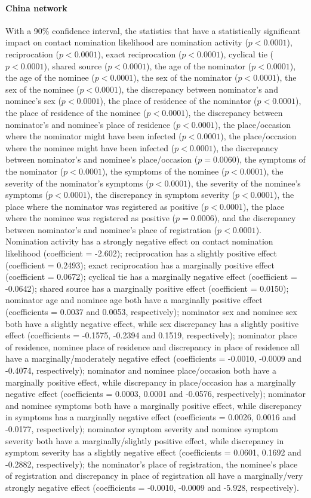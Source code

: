 \paragraph{China network} With a 90\% confidence interval, the statistics that have a statistically significant impact on contact nomination likelihood are nomination activity ($p<0.0001$), reciprocation ($p<0.0001$), exact reciprocation ($p<0.0001$), cyclical tie ($p<0.0001$), shared source ($p<0.0001$), the age of the nominator ($p<0.0001$), the age of the nominee ($p<0.0001$), the sex of the nominator ($p<0.0001$), the sex of the nominee ($p<0.0001$), the discrepancy between nominator's and nominee's sex ($p<0.0001$), the place of residence of the nominator ($p<0.0001$), the place of residence of the nominee ($p<0.0001$), the discrepancy between nominator's and nominee's place of residence ($p<0.0001$), the place/occasion where the nominator might have been infected ($p<0.0001$), the place/occasion where the nominee might have been infected ($p<0.0001$), the discrepancy between nominator's and nominee's place/occasion ($p=0.0060$), the symptoms of the nominator ($p<0.0001$), the symptoms of the nominee ($p<0.0001$), the severity of the nominator's symptoms ($p<0.0001$), the severity of the nominee's symptoms ($p<0.0001$), the discrepancy in symptom severity ($p<0.0001$), the place where the nominator was registered as positive ($p<0.0001$), the place where the nominee was registered as positive ($p=0.0006$), and the discrepancy between nominator's and nominee's place of registration ($p<0.0001$). Nomination activity has a strongly negative effect on contact nomination likelihood (coefficient = -2.602); reciprocation has a slightly positive effect (coefficient = 0.2493); exact reciprocation has a marginally positive effect (coefficient = 0.0672); cyclical tie has a marginally negative effect (coefficient = -0.0642); shared source has a marginally positive effect (coefficient = 0.0150); nominator age and nominee age both have a marginally positive effect (coefficients = 0.0037 and 0.0053, respectively); nominator sex and nominee sex both have a slightly negative effect, while sex discrepancy has a slightly positive effect (coefficients = -0.1575, -0.2394 and 0.1519, respectively); nominator place of residence, nominee place of residence and discrepancy in place of residence all have a marginally/moderately negative effect (coefficients = -0.0010, -0.0009 and -0.4074, respectively); nominator and nominee place/occasion both have a marginally positive effect, while discrepancy in place/occasion has a marginally negative effect (coefficients = 0.0003, 0.0001 and -0.0576, respectively); nominator and nominee symptoms both have a marginally positive effect, while discrepancy in symptoms has a marginally negative effect (coefficients = 0.0026, 0.0016 and -0.0177, respectively); nominator symptom severity and nominee symptom severity both have a marginally/slightly positive effect, while discrepancy in symptom severity has a slightly negative effect (coefficients = 0.0601, 0.1692 and -0.2882, respectively); the nominator's place of registration, the nominee's place of registration and discrepancy in place of registration all have a marginally/very strongly negative effect (coefficients = -0.0010, -0.0009 and -5.928, respectively).

